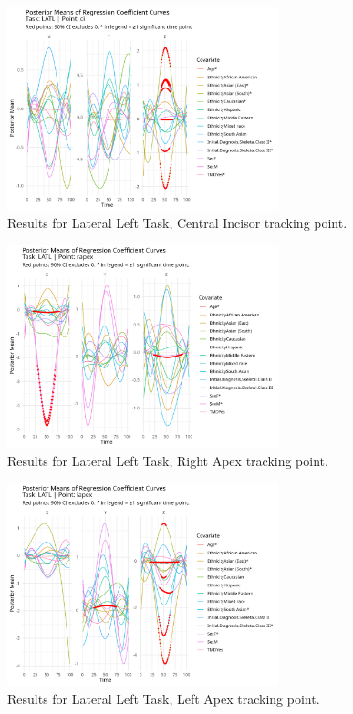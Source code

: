 \documentclass[AMA,Times1COL]{WileyNJDv5} %
\begin{document}
\begin{figure}[h]
    \centering
    \includegraphics[width = 0.7\textwidth]{latL_ci_plot.jpeg}
    \caption{Results for Lateral Left Task, Central Incisor tracking point.}
    \label{fig:latL_ci}
\end{figure}

\begin{figure}[h]
    \centering
    \includegraphics[width = 0.7\textwidth]{latL_rapex_plot.jpeg}
    \caption{Results for Lateral Left Task, Right Apex tracking point.}
    \label{fig:latL_rapex}
\end{figure}

\begin{figure}[h]
    \centering
    \includegraphics[width = 0.7\textwidth]{latL_lapex_plot.jpeg}
    \caption{Results for Lateral Left Task, Left Apex tracking point.}
    \label{fig:latL_lapex}
\end{figure}
\end{document}

